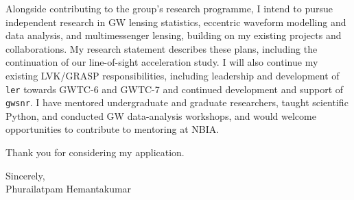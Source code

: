 \documentclass[11pt]{article}
\begin{document}
Alongside contributing to the group's research programme, I intend to pursue independent research in GW lensing statistics, eccentric waveform modelling and data analysis, and multimessenger lensing, building on my existing projects and collaborations. My research statement describes these plans, including the continuation of our line-of-sight acceleration study. I will also continue my existing LVK/GRASP responsibilities, including leadership and development of \texttt{ler} towards GWTC-6 and GWTC-7 and continued development and support of \texttt{gwsnr}. I have mentored undergraduate and graduate researchers, taught scientific Python, and conducted GW data-analysis workshops, and would welcome opportunities to contribute to mentoring at NBIA.

Thank you for considering my application.

Sincerely,\\
Phurailatpam Hemantakumar
\end{document}
